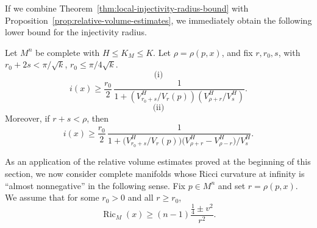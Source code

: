 If we combine Theorem~\ref{thm:local-injectivity-radius-bound} with Proposition~\ref{prop:relative-volume-estimates}, we immediately obtain the
following lower bound for the injectivity radius.

\begin{theorem}
\label{thm:injectivity-radius-relative-volume}

Let $M^n$ be complete with $H \le K_M \le K$.
Let $\rho=\rho(p,x)$, and fix $r, r_0, s$, with $r_0 + 2s < \pi/\sqrt{k}$,
$r_0 \le \pi/4\sqrt{k}$.
\[
\text{(i)}
\]
\begin{equation}
\tag{4.23}
i(x) \ge \frac{r_0}{2}\,\frac{1}{1+\left(V^H_{r_0+s}/V_r(p)\right)\left(V^H_{\rho+r}/V^H_s\right)}.
\end{equation}
\[
\text{(ii)}
\]
Moreover, if $r+s<\rho$, then
\begin{equation}
\tag{4.24}
i(x)\ge \frac{r_0}{2}\,\frac{1}{1+\bigl(V^{H}_{r_0+s}/V_r(p)\bigr)\bigl(V^{H}_{\rho+r}-V^{H}_{\rho-r}\bigr)/V^{H}_s}.
\end{equation}
\end{theorem}

As an application of the relative volume estimates proved at the beginning of
this section, we now consider complete manifolds whose Ricci curvature at
infinity is ``almost nonnegative'' in the following sense. Fix \(p\in M^n\) and
set \(r=\rho(p,x)\). We assume that for some \(r_0>0\) and all \(r\ge r_0\),
\begin{equation}\tag{4.25}
\operatorname{Ric}_M(x)\ge (n-1)\frac{\frac14\pm v^2}{r^2}.
\end{equation}

